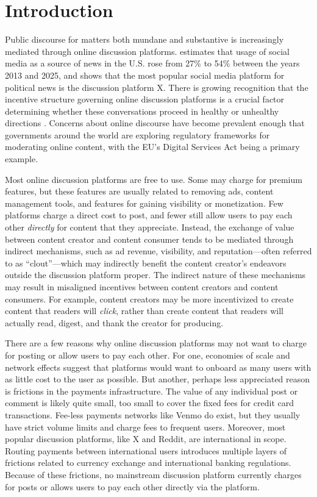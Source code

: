 \section{Introduction} \label{sec_intro}

Public discourse for matters both mundane and substantive is increasingly mediated through online discussion platforms. \citet{newman2025digitalnews} estimates that usage of social media as a source of news in the U.S. rose from 27\% to 54\% between the years 2013 and 2025, and \citet{mcclain2024pew} shows that the most popular social media platform for political news is the discussion platform X. There is growing recognition that the incentive structure governing online discussion platforms is a crucial factor determining whether these conversations proceed in healthy or unhealthy directions \citep{aridor2024}. Concerns about online discourse have become prevalent enough that governments around the world are exploring regulatory frameworks for moderating online content, with the EU's Digital Services Act being a primary example.

Most online discussion platforms are free to use. Some may charge for premium features, but these features are usually related to removing ads, content management tools, and features for gaining visibility or monetization. Few platforms charge a direct cost to post, and fewer still allow users to pay each other \emph{directly} for content that they appreciate. Instead, the exchange of value between content creator and content consumer tends to be mediated through indirect mechanisms, such as ad revenue, visibility, and reputation---often referred to as ``clout''---which may indirectly benefit the content creator's endeavors outside the discussion platform proper. The indirect nature of these mechanisms may result in misaligned incentives between content creators and content consumers. For example, content creators may be more incentivized to create content that readers will \emph{click}, rather than create content that readers will actually read, digest, and thank the creator for producing.

There are a few reasons why online discussion platforms may not want to charge for posting or allow users to pay each other. For one, economies of scale and network effects suggest that platforms would want to onboard as many users with as little cost to the user as possible. But another, perhaps less appreciated reason is frictions in the payments infrastructure. The value of any individual post or comment is likely quite small, too small to cover the fixed fees for credit card transactions. Fee-less payments networks like Venmo do exist, but they usually have strict volume limits and charge fees to frequent users. Moreover, most popular discussion platforms, like X and Reddit, are international in scope. Routing payments between international users introduces multiple layers of frictions related to currency exchange and international banking regulations. Because of these frictions, no mainstream discussion platform currently charges for posts or allows users to pay each other directly via the platform.

